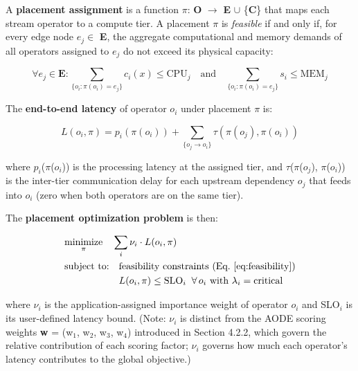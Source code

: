 \documentclass[preprint,review,12pt]{elsarticle}
\begin{document}
A \textbf{placement assignment} is a function $\pi$: \textbf{O} $\to$ \textbf{E} $\cup$ \{\textbf{C}\} that maps each stream operator to a compute tier. A placement $\pi$ is \emph{feasible} if and only if, for every edge node $e_j\in$ \textbf{E}, the aggregate computational and memory demands of all operators assigned to $e_j$ do not exceed its physical capacity:

\begin{equation}
\forall e_j \in \mathbf{E}: \sum_{\{o_i : \pi(o_i) = e_j\}} c_i(x) \leq \text{CPU}_j \quad \text{and} \quad \sum_{\{o_i : \pi(o_i) = e_j\}} s_i \leq \text{MEM}_j
\label{eq:feasibility}
\end{equation}

The \textbf{end-to-end latency} of operator $o_i$ under placement $\pi$ is:

\begin{equation}
L(o_i, \pi) = p_i(\pi(o_i)) + \sum_{\{o_j \to o_i\}} \tau(\pi(o_j), \pi(o_i))
\label{eq:latency}
\end{equation}

where $p_i$($\pi$($o_i$)) is the processing latency at the assigned tier, and $\tau$($\pi$($o_j$), $\pi$($o_i$)) is the inter-tier communication delay for each upstream dependency $o_j$ that feeds into $o_i$ (zero when both operators are on the same tier).

The \textbf{placement optimization problem} is then:

\begin{align}
&\underset{\pi}{\text{minimize}} \quad \sum_i \nu_i \cdot L(o_i, \pi) \label{eq:objective} \\
&\text{subject to:} \quad \text{feasibility constraints (Eq.~\ref{eq:feasibility})} \nonumber \\
&\phantom{\text{subject to:}} \quad L(o_i, \pi) \leq \text{SLO}_i \;\; \forall \, o_i \text{ with } \lambda_i = \text{critical} \nonumber
\end{align}

where $\nu_i$ is the application-assigned importance weight of operator $o_i$ and SLO$_i$ is its user-defined latency bound. (Note: $\nu_i$ is distinct from the AODE scoring weights \textbf{w} = (w$_1$, w$_2$, w$_3$, w$_4$) introduced in Section 4.2.2, which govern the relative contribution of each scoring factor; $\nu_i$ governs how much each operator's latency contributes to the global objective.)
\end{document}
